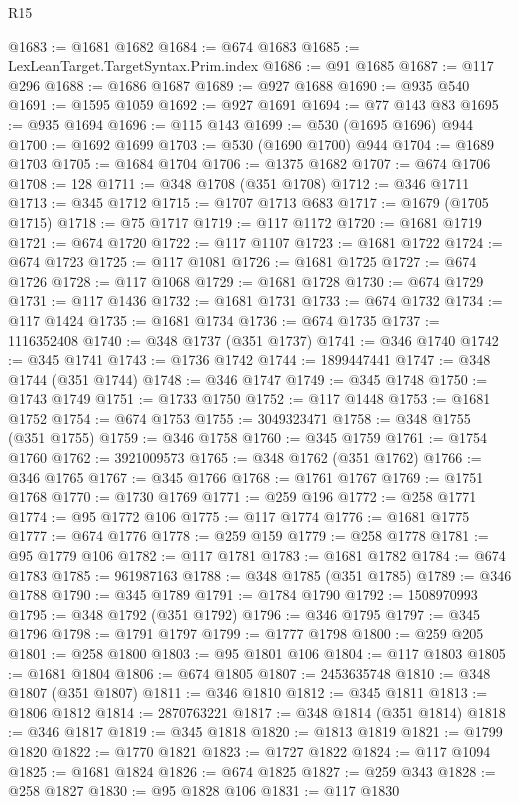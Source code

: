 \begin{lexlean}{R15}
\begin{coremodule}
@1683 := @1681 @1682
@1684 := @674 @1683
@1685 := LexLeanTarget.TargetSyntax.Prim.index
@1686 := @91 @1685
@1687 := @117 @296
@1688 := @1686 @1687
@1689 := @927 @1688
@1690 := @935 @540
@1691 := @1595 @1059
@1692 := @927 @1691
@1694 := @77 @143 @83
@1695 := @935 @1694
@1696 := @115 @143
@1699 := @530 (@1695 @1696) @944
@1700 := @1692 @1699
@1703 := @530 (@1690 @1700) @944
@1704 := @1689 @1703
@1705 := @1684 @1704
@1706 := @1375 @1682
@1707 := @674 @1706
@1708 := 128
@1711 := @348 @1708 (@351 @1708)
@1712 := @346 @1711
@1713 := @345 @1712
@1715 := @1707 @1713 @683
@1717 := @1679 (@1705 @1715)
@1718 := @75 @1717
@1719 := @117 @1172
@1720 := @1681 @1719
@1721 := @674 @1720
@1722 := @117 @1107
@1723 := @1681 @1722
@1724 := @674 @1723
@1725 := @117 @1081
@1726 := @1681 @1725
@1727 := @674 @1726
@1728 := @117 @1068
@1729 := @1681 @1728
@1730 := @674 @1729
@1731 := @117 @1436
@1732 := @1681 @1731
@1733 := @674 @1732
@1734 := @117 @1424
@1735 := @1681 @1734
@1736 := @674 @1735
@1737 := 1116352408
@1740 := @348 @1737 (@351 @1737)
@1741 := @346 @1740
@1742 := @345 @1741
@1743 := @1736 @1742
@1744 := 1899447441
@1747 := @348 @1744 (@351 @1744)
@1748 := @346 @1747
@1749 := @345 @1748
@1750 := @1743 @1749
@1751 := @1733 @1750
@1752 := @117 @1448
@1753 := @1681 @1752
@1754 := @674 @1753
@1755 := 3049323471
@1758 := @348 @1755 (@351 @1755)
@1759 := @346 @1758
@1760 := @345 @1759
@1761 := @1754 @1760
@1762 := 3921009573
@1765 := @348 @1762 (@351 @1762)
@1766 := @346 @1765
@1767 := @345 @1766
@1768 := @1761 @1767
@1769 := @1751 @1768
@1770 := @1730 @1769
@1771 := @259 @196
@1772 := @258 @1771
@1774 := @95 @1772 @106
@1775 := @117 @1774
@1776 := @1681 @1775
@1777 := @674 @1776
@1778 := @259 @159
@1779 := @258 @1778
@1781 := @95 @1779 @106
@1782 := @117 @1781
@1783 := @1681 @1782
@1784 := @674 @1783
@1785 := 961987163
@1788 := @348 @1785 (@351 @1785)
@1789 := @346 @1788
@1790 := @345 @1789
@1791 := @1784 @1790
@1792 := 1508970993
@1795 := @348 @1792 (@351 @1792)
@1796 := @346 @1795
@1797 := @345 @1796
@1798 := @1791 @1797
@1799 := @1777 @1798
@1800 := @259 @205
@1801 := @258 @1800
@1803 := @95 @1801 @106
@1804 := @117 @1803
@1805 := @1681 @1804
@1806 := @674 @1805
@1807 := 2453635748
@1810 := @348 @1807 (@351 @1807)
@1811 := @346 @1810
@1812 := @345 @1811
@1813 := @1806 @1812
@1814 := 2870763221
@1817 := @348 @1814 (@351 @1814)
@1818 := @346 @1817
@1819 := @345 @1818
@1820 := @1813 @1819
@1821 := @1799 @1820
@1822 := @1770 @1821
@1823 := @1727 @1822
@1824 := @117 @1094
@1825 := @1681 @1824
@1826 := @674 @1825
@1827 := @259 @343
@1828 := @258 @1827
@1830 := @95 @1828 @106
@1831 := @117 @1830

\end{coremodule}
\end{lexlean}
